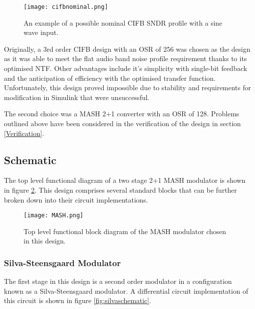 \begin{figure}
    \begin{center}
    \texttt{[image: cifbnominal.png]}
    \caption{An example of a possible nominal CIFB SNDR profile with a sine wave input.}
    \label{fig:cifbnominal}
    \end{center}
\end{figure}


Originally, a 3rd order CIFB design with an OSR of 256 was chosen as the design as it was able to meet the flat audio band noise profile requirement thanks to its optimised NTF.
Other advantages include it's simplicity with single-bit feedback and the anticipation of efficiency with the optimised transfer function.
Unfortunately, this design proved impossible due to stability and requirements for modification in Simulink that were unsuccessful.

The second choice was a MASH 2+1 converter with an OSR of 128.
Problems outlined above have been considered in the verification of the design in section \ref{Verification}.

    \subsection{Schematic}
    \label{Design:schematic}
    The top level functional diagram of a two stage 2+1 MASH modulator is shown in figure \ref{fig:MASH}.
    This design comprises several standard blocks that can be further broken down into their circuit implementations.

    \begin{figure}
        \begin{center}
        \texttt{[image: MASH.png]}
        \caption{Top level functional block diagram of the MASH modulator chosen in this design.}
        \label{fig:MASH}
        \end{center}
    \end{figure}

        \subsubsection{Silva-Steensgaard Modulator}
        The first stage in this design is a second order modulator in a configuration known as a Silva-Steensgaard modulator.
        A differential circuit implementation of this circuit is shown in figure \ref{fig:silvaschematic}.

